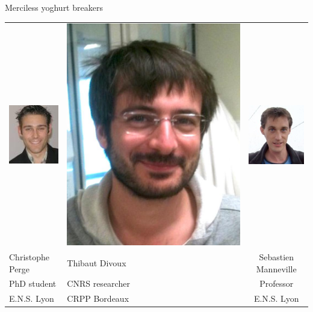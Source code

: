 \documentclass[xcolor=table]{beamer}
\begin{document}
\begin{frame}{Merciless yoghurt breakers}
\begin{tabu}{X[c]X[c]c}
\includegraphics[height=0.3\textheight]{Chris}&
\includegraphics[height=0.3\textheight]{Thibaut}&
\includegraphics[height=0.3\textheight]{Seb}\\
Christophe Perge & Thibaut Divoux & Sebastien Manneville\\
PhD student & CNRS researcher & Professor\\
E.N.S. Lyon &  CRPP Bordeaux & E.N.S. Lyon\\
\end{tabu}
\end{frame}
\end{document}
